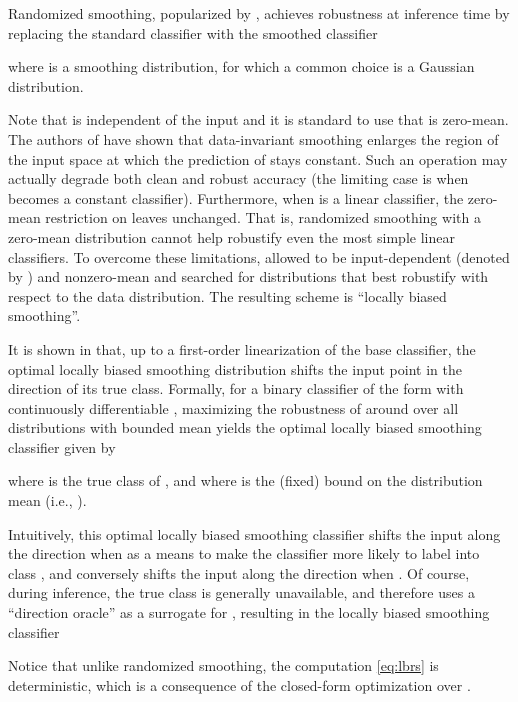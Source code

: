 \documentclass[11pt, letterpaper]{article}
\theoremstyle{plain}
\theoremstyle{definition}
\begin{document}
Randomized smoothing, popularized by \citep{Cohen19}, achieves robustness at inference time by replacing the standard classifier  with the smoothed classifier

where  is a smoothing distribution, for which a common choice is a Gaussian distribution.

Note that  is independent of the input  and it is standard to use  that is zero-mean. The authors of \citep{Anderson21b} have shown that data-invariant smoothing enlarges the region of the input space at which the prediction of  stays constant. Such an operation may actually degrade both clean and robust accuracy (the limiting case is when  becomes a constant classifier). Furthermore, when  is a linear classifier, the zero-mean restriction on  leaves  unchanged. That is, randomized smoothing with a zero-mean distribution cannot help robustify even the most simple linear classifiers. To overcome these limitations, \citep{Anderson21b} allowed  to be input-dependent (denoted by ) and nonzero-mean and searched for distributions  that best robustify  with respect to the data distribution. The resulting scheme is ``locally biased smoothing''.

It is shown in \citep{Anderson21b} that, up to a first-order linearization of the base classifier, the optimal locally biased smoothing distribution  shifts the input point in the direction of its true class. Formally, for a binary classifier of the form  with continuously differentiable , maximizing the robustness of  around  over all distributions  with bounded mean yields the optimal locally biased smoothing classifier given by

where  is the true class of , and where  is the (fixed) bound on the distribution mean (i.e., ).

Intuitively, this optimal locally biased smoothing classifier shifts the input along the direction  when  as a means to make the classifier more likely to label  into class , and conversely shifts the input along the direction  when . Of course, during inference, the true class  is generally unavailable, and therefore \citep{Anderson21b} uses a ``direction oracle''  as a surrogate for , resulting in the locally biased smoothing classifier

Notice that unlike randomized smoothing, the computation \cref{eq:lbrs} is deterministic, which is a consequence of the closed-form optimization over .
\end{document}
